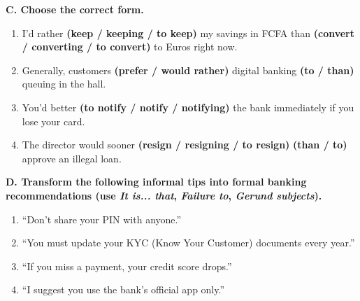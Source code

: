 \documentclass[11pt]{article}
\begin{document}
\begin{exercice}
\textbf{C. Choose the correct form.}
\begin{enumerate}
    \item I'd rather \textbf{(keep / keeping / to keep)} my savings in FCFA than \textbf{(convert / converting / to convert)} to Euros right now.
    \item Generally, customers \textbf{(prefer / would rather)} digital banking \textbf{(to / than)} queuing in the hall.
    \item You'd better \textbf{(to notify / notify / notifying)} the bank immediately if you lose your card.
    \item The director would sooner \textbf{(resign / resigning / to resign)} \textbf{(than / to)} approve an illegal loan.
\end{enumerate}

\textbf{D. Transform the following informal tips into formal banking recommendations (use \textit{It is... that}, \textit{Failure to}, \textit{Gerund subjects}).}
\begin{enumerate}
    \item ``Don't share your PIN with anyone.''
    \item ``You must update your KYC (Know Your Customer) documents every year.''
    \item ``If you miss a payment, your credit score drops.''
    \item ``I suggest you use the bank's official app only.''
\end{enumerate}
\end{exercice}
\end{document}
